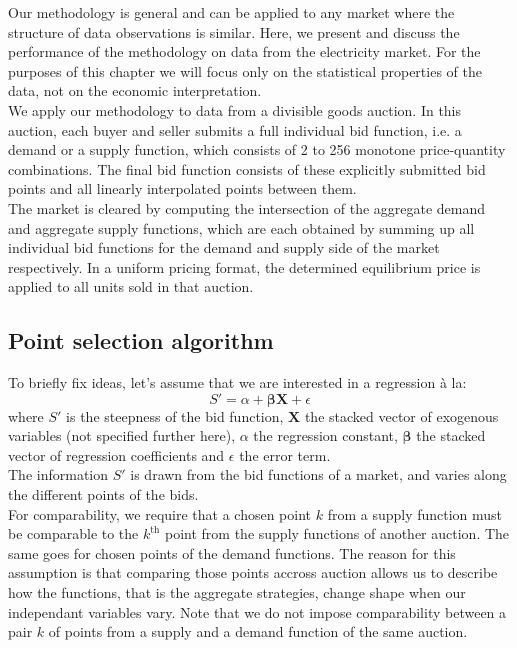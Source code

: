 Our methodology is general and can be applied to any market where the structure of data observations is similar. Here, we present and discuss the performance of the methodology on data from the electricity market. For the purposes of this chapter we will focus only on the statistical properties of the data, not on the economic interpretation.\\

We apply our methodology to data from a divisible goods auction. In this auction, each buyer and seller submits a full individual bid function, i.e. a demand or a supply function, which consists of 2 to 256 monotone price-quantity combinations. The final bid function consists of these explicitly submitted bid points and all linearly interpolated points between them.\\

The market is cleared by computing the intersection of the aggregate demand and aggregate supply functions, which are each obtained by summing up all individual bid functions for the demand and supply side of the market respectively. In a uniform pricing format, the determined equilibrium price is applied to all units sold in that auction.


\subsection{Point selection algorithm}\label{pointselect}

To briefly fix ideas, let's assume that we are interested in a regression \`{a} la: 
$$ S' = \alpha + \boldsymbol{\beta  X} + \epsilon$$
where $S'$ is the steepness of the bid function, $\boldsymbol{X}$ the stacked vector of exogenous variables (not specified further here), $\alpha$ the regression constant, $\boldsymbol{\beta}$ the stacked vector of regression coefficients and $\epsilon$ the error term. \\

The information $S'$ is drawn from the bid functions of a %
market, and varies along the different points of the bids.\\

For comparability, we require that a chosen point $k$ from a supply function must be comparable to the $k^\text{th}$ point from the supply functions of another auction. The same goes for chosen points of the demand functions. The reason for this assumption is that comparing those points accross auction allows us to describe how the functions, that is the aggregate strategies, change shape when our independant variables vary. Note that we do not impose comparability between a pair $k$ of points from a supply and a demand function of the same auction. 

